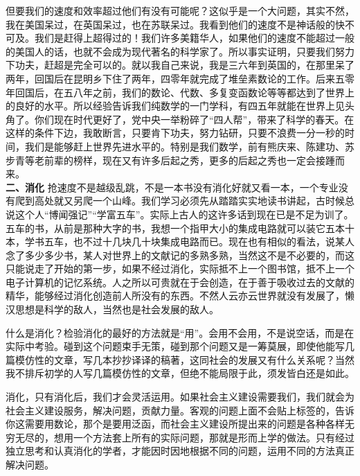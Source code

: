 \documentclass[twoside,openright,headings=optiontohead]{ctexbook} %
\begin{document}
{但要我们的速度和效率超过他们有没有可能呢？这似乎是一个大问题，其实不然，我在美国呆过，在英国呆过，也在苏联呆过。我看到他们的速度不是神话般的快不可及。我们是赶得上超得过的！我们许多美籍华人，如果他们的速度不能超过一般的美国人的话，也就不会成为现代著名的科学家了。所以事实证明，只要我们努力下功夫，赶超是完全可以的。就以我自己来说，我是三六年到英国的，在那里呆了两年，回国后在昆明乡下住了两年，四零年就完成了堆垒素数论的工作。后来五零年回国后，在五八年之前，我们的数论、代数、多复变函数论等等都达到了世界上的良好的水平。所以经验告诉我们纯数学的一门学科，有四五年就能在世界上见头角了。你们现在时代更好了，党中央一举粉碎了``四人帮''，带来了科学的春天。在这样的条件下边，我敢断言，只要肯下功夫，努力钻研，只要不浪费一分一秒的时间，我们是能够赶上世界先进水平的。特别是我们数学，前有熊庆来、陈建功、苏步青等老前辈的榜样，现在又有许多后起之秀，更多的后起之秀也一定会接踵而来。\\
\textbf{二、消化} 抢速度不是越级乱跳，不是一本书没有消化好就又看一本，一个专业没有爬到高处就又另爬一个山峰。我们学习必须先从踏踏实实地读书讲起，古时候总说这个人``博闻强记''``学富五车''。实际上古人的这许多话到现在已是不足为训了。五车的书，从前是那种大字的书，我想一个指甲大小的集成电路就可以装它五本十本，学书五车，也不过十几块几十块集成电路而已。现在也有相似的看法，说某人念了多少多少书，某人对世界上的文献记的多熟多熟，当然这不是不必要的，而这只能说走了开始的第一步，如果不经过消化，实际抵不上一个图书馆，抵不上一个电子计算机的记忆系统。人之所以可贵就在于会创造，在于善于吸收过去的文献的精华，能够经过消化创造前人所没有的东西。不然人云亦云世界就没有发展了，懒汉思想是科学的敌人，当然也是社会发展的敌人。

什么是消化？检验消化的最好的方法就是``用''。会用不会用，不是说空话，而是在实际中考验。碰到这个问题束手无策，碰到那个问题又是一筹莫展，即使他能写几篇模仿性的文章，写几本抄抄译译的稿著，这同社会的发展又有什么关系呢？当然我不排斥初学的人写几篇模仿性的文章，但绝不能局限于此，须发皆白还是如此。

消化，只有消化后，我们才会灵活运用。如果社会主义建设需要我们，我们就会为社会主义建设服务，解决问题，贡献力量。客观的问题上面不会贴上标签的，告诉你这需要用数论，那个是要用泛函，而社会主义建设所提出来的问题是各种各样无穷无尽的，想用一个方法套上所有的实际问题，那就是形而上学的做法。只有经过独立思考和认真消化的学者，才能因时因地根据不同的问题，运用不同的方法真正解决问题。

}
\end{document}
